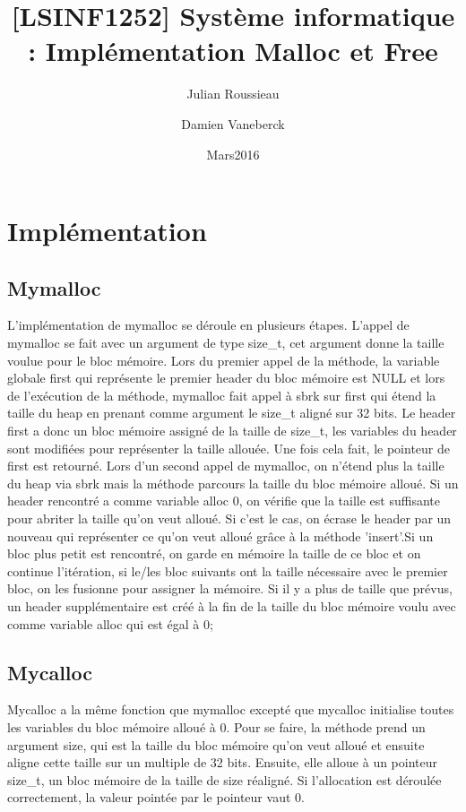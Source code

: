 \documentclass[11pt]{article}
\title{[LSINF1252] Système informatique : Implémentation Malloc et Free}
\author{Julian Roussieau \and Damien Vaneberck }
\date{Mars2016}
\begin{document}
\maketitle

\section{Implémentation}

\subsection{Mymalloc} L'implémentation de mymalloc se déroule en plusieurs étapes. L'appel de mymalloc se fait avec un argument de type size\_t, cet argument donne la taille voulue pour le bloc mémoire. Lors du premier appel de la méthode, la variable globale first qui représente le premier header du bloc mémoire est NULL et lors de l'exécution de la méthode, mymalloc fait appel à sbrk sur first qui étend la taille du heap en prenant comme argument le size\_t aligné sur 32 bits. Le header first a donc un bloc mémoire assigné de la taille de size\_t, les variables du header sont modifiées pour représenter la taille allouée. Une fois cela fait, le pointeur de first est retourné. Lors d'un second appel de mymalloc, on n'étend plus la taille du heap via sbrk mais la méthode parcours la taille du bloc mémoire alloué. Si un header rencontré a comme variable alloc 0, on vérifie que la taille est suffisante pour abriter la taille qu'on veut alloué. Si c'est le cas, on écrase le header par un nouveau qui représenter ce qu'on veut alloué grâce à la méthode 'insert'.Si un bloc plus petit est rencontré, on garde en mémoire la taille de ce bloc et on continue l'itération, si le/les bloc suivants ont la taille nécessaire avec le premier bloc, on les fusionne pour assigner la mémoire. Si il y a plus de taille que prévus, un header supplémentaire est créé à la fin de la taille du bloc mémoire voulu avec comme variable alloc qui est égal à 0;

\subsection{Mycalloc}
Mycalloc a la même fonction que mymalloc excepté que mycalloc initialise toutes les variables du bloc mémoire alloué à 0. Pour se faire, la méthode prend un argument size, qui est la taille du bloc mémoire qu'on veut alloué et ensuite aligne cette taille sur un multiple de 32 bits. Ensuite, elle alloue à un pointeur size\_t, un bloc mémoire de la taille de size réaligné. Si l'allocation est déroulée correctement, la valeur pointée par le pointeur vaut 0.
\end{document}
